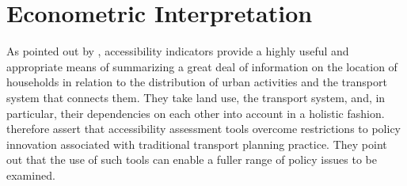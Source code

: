 \section{Econometric Interpretation}
As pointed out by \citet{MorrisEtAl1978AccessibilityIndicatorsaccessibility}, accessibility indicators provide a highly
useful and appropriate means of summarizing a great deal of information on the location of households in relation to 
the distribution of urban activities and the transport system that connects them.
%
%
They take land use, the transport system, and, in particular, their dependencies on each other into
account in a holistic fashion.
%
%
\citet{CurtisEtAl2013AccessbilityPolicyInnovation} therefore assert that accessibility assessment tools overcome
restrictions to policy innovation associated with traditional transport planning practice. They point out that the use of
such tools can enable a fuller range of policy issues to be examined.


